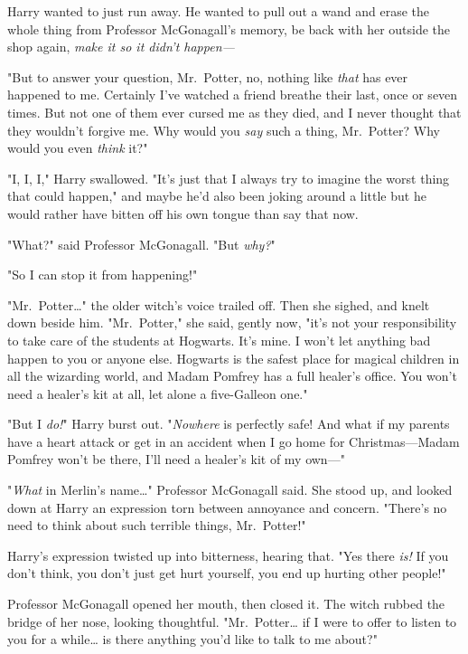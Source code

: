 Harry wanted to just run away. He wanted to pull out a wand and erase the whole
thing from Professor McGonagall's memory, be back with her outside the shop
again, \emph{make it so it didn't happen---}

"But to answer your question, Mr.~Potter, no, nothing like \emph{that} has ever
happened to me. Certainly I've watched a friend breathe their last, once or
seven times. But not one of them ever cursed me as they died, and I never
thought that they wouldn't forgive me. Why would you \emph{say} such a thing,
Mr.~Potter? Why would you even \emph{think} it?"

"I, I, I," Harry swallowed. "It's just that I always try to imagine the worst
thing that could happen," and maybe he'd also been joking around a little but
he would rather have bitten off his own tongue than say that now.

"What?" said Professor McGonagall. "But \emph{why?}"

"So I can stop it from happening!"

"Mr.~Potter{\ldots}" the older witch's voice trailed off. Then she sighed, and
knelt down beside him. "Mr.~Potter," she said, gently now, "it's not your
responsibility to take care of the students at Hogwarts. It's mine. I won't let
anything bad happen to you or anyone else. Hogwarts is the safest place for
magical children in all the wizarding world, and Madam Pomfrey has a full
healer's office. You won't need a healer's kit at all, let alone a five-Galleon
one."

"But I \emph{do!}" Harry burst out. "\emph{Nowhere} is perfectly safe! And what
if my parents have a heart attack or get in an accident when I go home for
Christmas---Madam Pomfrey won't be there, I'll need a healer's kit of my own---"

"\emph{What} in Merlin's name{\ldots}" Professor McGonagall said. She stood up,
and looked down at Harry an expression torn between annoyance and concern.
"There's no need to think about such terrible things, Mr.~Potter!"

Harry's expression twisted up into bitterness, hearing that. "Yes there
\emph{is!} If you don't think, you don't just get hurt yourself, you end up
hurting other people!"

Professor McGonagall opened her mouth, then closed it. The witch rubbed the
bridge of her nose, looking thoughtful. "Mr.~Potter{\ldots} if I were to offer
to listen to you for a while{\ldots} is there anything you'd like to talk to me
about?"

